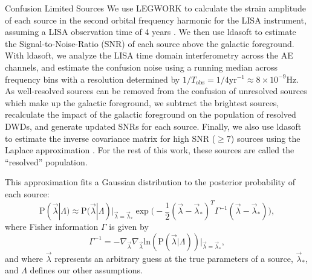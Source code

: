 \documentclass[twocolumn]{aastex631}
\newcommand*{\pprob}{\mathrm{P}}
\newcommand*{\BinaryParameters}{\vec{\lambda}}
\newcommand*{\FormationParameters}{\Lambda}
\newcommand*{\tobs}{T_{\mathrm{obs}}}
\begin{document}
\begin{subsection}{Confusion Limited Sources}
\label{sec:detection}
We use LEGWORK \citep{LEGWORK} to calculate the strain amplitude of each source
    in the second orbital frequency harmonic for the LISA instrument,
    assuming a LISA observation time of 4 years
    \citep[see Section 3 of][]{Thiele2023}.
We then use ldasoft \citep{ldasoft}
    to estimate the Signal-to-Noise-Ratio (SNR)
    of each source above the galactic foreground.
With ldasoft, we analyze the LISA time domain interferometry
    across the AE channels,
    and estimate the confusion noise using a running median
    across frequency bins with a resolution determined
    by $1/\tobs = 1/4 \mathrm{yr}^{-1} \approx 8 \times 10^{-9} \mathrm{Hz}$.
As well-resolved sources can be removed from the confusion of unresolved sources
    which make up the galactic foreground,
    we subtract the brightest sources,
    recalculate the impact of the galactic foreground on the population of resolved DWDs,
    and generate updated SNRs for each source.
Finally, we also use ldasoft to estimate the inverse covariance matrix
    for high SNR ($\geq 7$) sources using the Laplace approximation
    \citep{flournoy1991statistical, Cutler1994FisherGW}.
For the rest of this work, 
    these sources are called the ``resolved'' population.

This approximation
    fits a Gaussian distribution to the posterior probability of each source:
\begin{equation}\label{eq:laplace-approx}
    \pprob(\BinaryParameters|\FormationParameters) \approx 
    \pprob(\BinaryParameters|\FormationParameters)|_{\BinaryParameters=\BinaryParameters_{*}}
        \exp \Big(
        -\frac{1}{2}(\BinaryParameters - \BinaryParameters_{*})^{T}
        \Gamma^{-1}
        (\BinaryParameters - \BinaryParameters_{*})
        \Big),
\end{equation}
where Fisher information $\Gamma$ is given by
\begin{equation}\label{eq:fisher}
\Gamma^{-1} = - \nabla_{\BinaryParameters}\nabla_{\BinaryParameters} 
    \mathrm{ln}(\pprob(\BinaryParameters | \FormationParameters))\Big|_{
    \BinaryParameters = \BinaryParameters_{*}},
\end{equation}
and where $\BinaryParameters$ represents an arbitrary guess at the true
    parameters of a source, $\BinaryParameters_*$,
    and $\FormationParameters$ defines our other assumptions.


\end{subsection}
\end{document}
